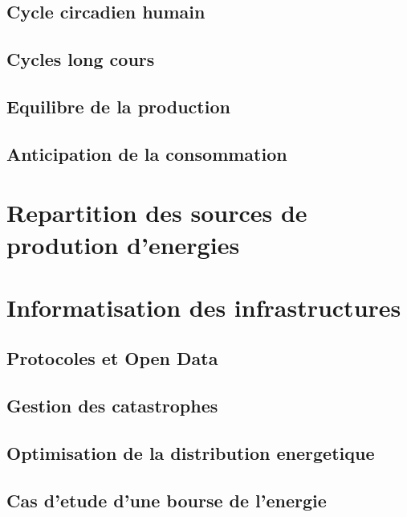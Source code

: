 \section{Cycle circadien humain}
\section{Cycles long cours}
\section{Equilibre de la production}
\section{Anticipation de la consommation}

\chapter{Repartition des sources de prodution d'energies}

\chapter{Informatisation des infrastructures}
\section{Protocoles et Open Data}
\section{Gestion des catastrophes}
\section{Optimisation de la distribution energetique}
\section{Cas d'etude d'une bourse de l'energie}
